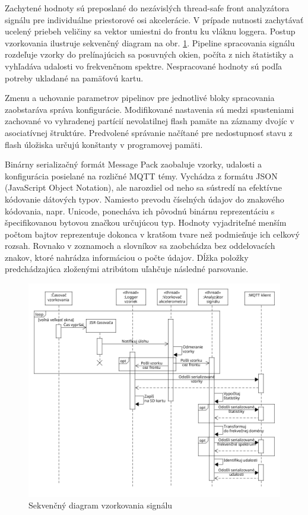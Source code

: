 Zachytené hodnoty sú preposlané do nezávislých thread-safe front analyzátora signálu pre individuálne priestorové osi akcelerácie. 
V prípade nutnosti zachytávať ucelený priebeh veličiny  sa vektor umiestni do frontu ku vláknu loggera. Postup vzorkovania 
ilustruje sekvenčný diagram na obr. \ref{uml:sequence}. Pipeline spracovania signálu rozdeľuje vzorky do prelínajúcich sa posuvných okien, 
počíta z nich štatistiky a vyhľadáva udalosti vo frekvenčnom spektre. Nespracované hodnoty sú podľa potreby ukladané na pamäťovú kartu. 

Zmenu a uchovanie parametrov pipelinov pre jednotlivé bloky spracovania zaobstaráva správa konfigurácie. Modifikované nastavenia sú medzi 
spusteniami zachované vo vyhradenej partícií nevolatilnej flash pamäte na záznamy dvojíc v asociatívnej štruktúre. Predvolené správanie 
načítané pre nedostupnosť stavu z flash úložiska určujú konštanty v programovej pamäti.

Binárny serializačný formát Message Pack zaobaluje vzorky, udalosti a konfigurácia posielané na rozličné MQTT témy. Vychádza z 
formátu JSON (JavaScript Object Notation), ale narozdiel od neho sa sústredí na efektívne kódovanie dátových typov. Namiesto prevodu 
číselných údajov do znakového kódovania, napr. Unicode, ponecháva ich pôvodnú binárnu reprezentáciu s špecifikovanou bytovou značkou 
určujúcou typ. Hodnoty vyjadriteľné menším počtom bajtov reprezentuje dokonca v kratšom tvare než podmieňuje ich celkový rozsah.
Rovnako v zoznamoch a slovníkov sa  zaobchádza bez oddelovacích znakov, ktoré nahrádza informáciou o počte údajov. Dĺžka 
položky predchádzajúca zloženými atribútom uľahčuje následné parsovanie.

\begin{figure}[h]
	\centering
	\includegraphics[width=\textwidth]{figures/design/tasks.png}
	\caption{Sekvenčný diagram vzorkovania signálu}
	\label{uml:sequence}
\end{figure}

